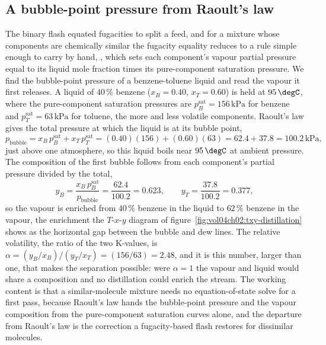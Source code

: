 

\subsection{A bubble-point pressure from Raoult's law}

The binary flash equated fugacities to split a feed, and for a mixture whose
components are chemically similar the fugacity equality reduces to a rule
simple enough to carry by hand, , which sets each
component's vapour partial pressure equal to its liquid mole fraction times
its pure-component saturation pressure. We find the bubble-point pressure of
a benzene-toluene liquid and read the vapour it first releases. A liquid of
$40\,\%$ benzene ($x_B = 0.40$, $x_T = 0.60$) is held at $95\,\degC$, where
the pure-component saturation pressures are $p_B^{\text{sat}} = 156\,\text{kPa}$
for benzene and $p_T^{\text{sat}} = 63\,\text{kPa}$ for toluene, the more and
less volatile components. Raoult's law gives the total pressure at which the
liquid is at its bubble point,
\[
p_{\text{bubble}} = x_B\,p_B^{\text{sat}} + x_T\,p_T^{\text{sat}} =
(0.40)(156) + (0.60)(63) = 62.4 + 37.8 = 100.2\,\text{kPa},
\]
just above one atmosphere, so this liquid boils near $95\,\degC$ at ambient
pressure. The composition of the first bubble follows from each component's
partial pressure divided by the total,
\[
y_B = \frac{x_B\,p_B^{\text{sat}}}{p_{\text{bubble}}} = \frac{62.4}{100.2} =
0.623, \qquad y_T = \frac{37.8}{100.2} = 0.377,
\]
so the vapour is enriched from $40\,\%$ benzene in the liquid to $62\,\%$
benzene in the vapour, the enrichment the $T$-$x$-$y$ diagram of
figure~\ref{fig:vol04ch02:txy-distillation} shows as the horizontal gap
between the bubble and dew lines. The relative volatility, the ratio of the
two K-values, is $\alpha = (y_B/x_B)/(y_T/x_T) = (156/63) = 2.48$, and it is
this number, larger than one, that makes the separation possible: were
$\alpha = 1$ the vapour and liquid would share a composition and no
distillation could enrich the stream. The working content is that a
similar-molecule mixture needs no equation-of-state solve for a first pass,
because Raoult's law hands the bubble-point pressure and the vapour
composition from the pure-component saturation curves alone, and the departure
from Raoult's law is the correction a fugacity-based flash restores for
dissimilar molecules.



